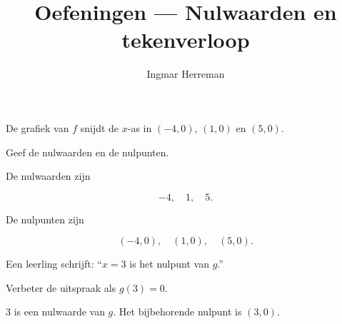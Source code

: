 \documentclass{ximera}
\title{Oefeningen — Nulwaarden en tekenverloop}
\author{Ingmar Herreman}
\begin{document}



\maketitle

\FVDbeginExercises







\begin{oefening}{\oefB\ESS}

\begin{question}
De grafiek van \(f\) snijdt de \(x\)-as in
\((-4,0)\), \((1,0)\) en \((5,0)\).

Geef de nulwaarden en de nulpunten.

\begin{oplossing}
De nulwaarden zijn

\[
-4,\quad 1,\quad 5.
\]

De nulpunten zijn

\[
(-4,0),\quad (1,0),\quad (5,0).
\]
\end{oplossing}
\end{question}

\begin{question}
Een leerling schrijft:
``\(x=3\) is het nulpunt van \(g\).''

Verbeter de uitspraak als \(g(3)=0\).

\begin{oplossing}
\(3\) is een nulwaarde van \(g\).
Het bijbehorende nulpunt is \((3,0)\).
\end{oplossing}
\end{question}

\end{oefening}
\end{document}
